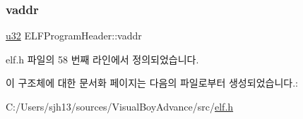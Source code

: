\subsubsection{\texorpdfstring{vaddr}{vaddr}}
{\footnotesize\ttfamily \mbox{\hyperlink{_system_8h_a10e94b422ef0c20dcdec20d31a1f5049}{u32}} E\+L\+F\+Program\+Header\+::vaddr}



elf.\+h 파일의 58 번째 라인에서 정의되었습니다.



이 구조체에 대한 문서화 페이지는 다음의 파일로부터 생성되었습니다.\+:\begin{DoxyCompactItemize}
\item 
C\+:/\+Users/sjh13/sources/\+Visual\+Boy\+Advance/src/\mbox{\hyperlink{elf_8h}{elf.\+h}}\end{DoxyCompactItemize}
